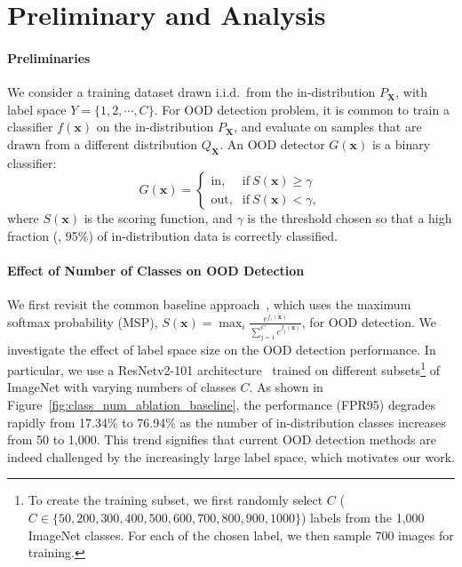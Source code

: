 \documentclass[final]{cvpr}
\def\*#1{\mathbf{#1}}
\begin{document}
\section{Preliminary and Analysis}
\vspace{-0.1cm}
\paragraph{Preliminaries} We consider a training dataset drawn i.i.d.\ from the in-distribution $P_{\bm{X}}$, with label space ${Y} = \{1,2,\cdots,C \}$. For OOD detection problem, it is common to train a classifier $f(\mathbf{x})$ on the in-distribution $P_{\bm{X}}$, and evaluate on samples that are drawn from a different distribution $Q_{\bm{X}}$. An OOD detector $G(\mathbf{x})$ is a binary classifier:
\vspace{-0.1cm}
\begin{equation*}
    G(\mathbf{x}) = 
    \begin{cases}
    \text{in}, &\text{if}\ S(\mathbf{x}) \geq \gamma \\
    \text{out}, &\text{if}\ S(\mathbf{x}) < \gamma,
    \end{cases}
\end{equation*}
where $S(\mathbf{x})$ is the scoring function, and $\gamma$ is the threshold chosen so that a high fraction (\eg, 95\%) of in-distribution data is correctly classified. 

\vspace{-0.3cm}
\paragraph{Effect of Number of Classes on OOD Detection} We first revisit the common baseline approach~\cite{hendrycks2016baseline}, which uses the maximum softmax probability (MSP), $S(\*x)=\max_i \frac{e^{f_i(\*x)}}{\sum_{j=1}^C e^{f_j(\*x)}}$, for OOD detection. We investigate the effect of label space size on the OOD detection performance. In particular, we use a ResNetv2-101 architecture~\cite{he2016identity} trained on different subsets\footnote{To create the training subset, we first randomly select $C$ ($C \in \{50, 200, 300, 400, 500, 600, 700, 800, 900, 1000\}$) labels from the 1,000 ImageNet classes. For each of the chosen label, we then sample 700 images for training.} of ImageNet with varying numbers of classes $C$. As shown in Figure~\ref{fig:class_num_ablation_baseline}, the performance (FPR95) degrades rapidly from 17.34\% to 76.94\% as the number of in-distribution classes increases from 50 to 1,000. 
This trend signifies that current OOD detection methods are indeed challenged by the
increasingly large label space, which motivates our work. 
\end{document}
